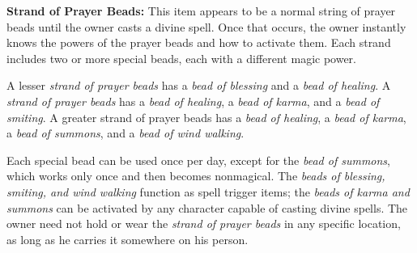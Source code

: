 \textbf{Strand of Prayer Beads:} This item appears to be a normal string of prayer beads until the owner casts a divine spell. Once that occurs, the owner instantly knows the powers of the prayer beads and how to activate them. Each strand includes two or more special beads, each with a different magic power.


A lesser \emph{strand of prayer beads} has a \emph{bead of blessing} and a \emph{bead of healing}. A \emph{strand of prayer beads} has a \emph{bead of healing}, a \emph{bead of karma}, and a \emph{bead of smiting}. A greater strand of prayer beads has a \emph{bead of healing}, a \emph{bead of karma}, a \emph{bead of summons}, and a \emph{bead of wind walking}.

Each special bead can be used once per day, except for the \emph{bead of summons}, which works only once and then becomes nonmagical. The \emph{beads of blessing, smiting, and wind walking} function as spell trigger items; the \emph{beads of karma and summons} can be activated by any character capable of casting divine spells. The owner need not hold or wear the \emph{strand of prayer beads} in any specific location, as long as he carries it somewhere on his person.

